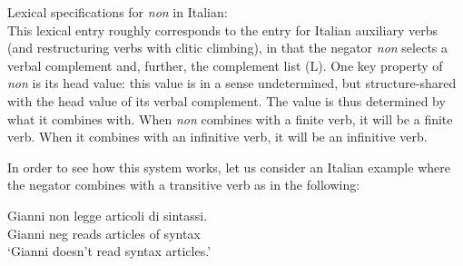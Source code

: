 \documentclass[output=paper
                ,modfonts
                ,nonflat
	        ,collection
	        ,collectionchapter
	        ,collectiontoclongg
 	        ,biblatex
                ,babelshorthands
                ,newtxmath
                ,draftmode
                ,colorlinks, citecolor=brown
]{./langsci/langscibook}
\begin{document}
{\begin{exe}
\begin{xlist}
{}
\ea
\label{negation-non}
Lexical specifications for \textit{non} in Italian:\\
\z
%
\noindent
This lexical entry roughly corresponds to the entry for
Italian auxiliary verbs (and restructuring verbs with clitic climbing),
in that the negator \textit{non} selects a verbal complement and, further, the
complement list (L). One key property of \textit{non}
is its {\sc head} value: this value is in a sense undetermined, but structure-shared with the {\sc head} value of its verbal complement.
The value is thus
determined by what it combines with. When \textit{non} combines with a finite
verb, it will be a finite verb. When it combines with an
infinitive verb, it will be an infinitive verb.

In order to see how
this system works, let us consider an Italian example where
the negator combines with a transitive verb as in the
following:

\begin{exe}
\ex
\label{negation-read-it}
\gll Gianni non legge articoli di sintassi.\\
Gianni {\sc neg} reads articles of syntax\\
\glt `Gianni doesn't read syntax articles.'
\end{exe}


\end{xlist}
\end{exe}}
\end{document}
